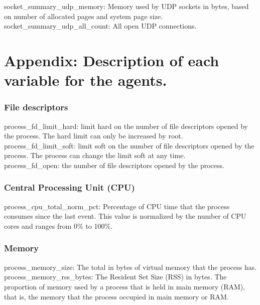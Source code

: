 \documentclass{iosart2c}
\begin{document}
socket\_summary\_udp\_memory: Memory used by UDP sockets in bytes, based on number of allocated pages and system page size.\\

socket\_summary\_udp\_all\_count: All open UDP connections.\\



\section{Appendix: Description of each variable for the agents.} \label{agent_variables}


\subsubsection{File descriptors}

process\_fd\_limit\_hard: limit hard on the number of file descriptors opened by the process. The hard limit can only be increased by root.\\

process\_fd\_limit\_soft: limit soft on the number of file descriptors opened by the process. The process can change the limit soft at any time.\\

process\_fd\_open: the number of file descriptors opened by the process.\\


\subsubsection{Central Processing Unit (CPU)}

process\_cpu\_total\_norm\_pct: Percentage of CPU time that the process consumes since the last event. This value is normalized by the number of CPU cores and ranges from 0\% to 100\%.\\

\subsubsection{Memory}

process\_memory\_size: The total in bytes of virtual memory that the process has.\\

process\_memory\_rss\_bytes: The Resident Set Size (RSS) in bytes. The proportion of memory used by a process that is held in main memory (RAM), that is, the memory that the process occupied in main memory or RAM.\\
\end{document}
